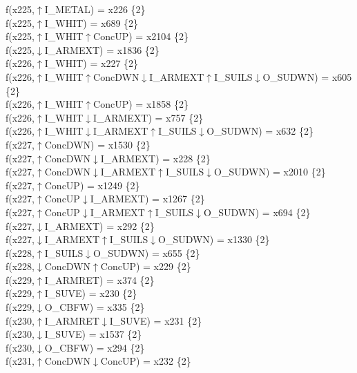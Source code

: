 f(x225,$\uparrow$I\_METAL) = x226 \{2\} \\  
f(x225,$\uparrow$I\_WHIT) = x689 \{2\} \\  
f(x225,$\uparrow$I\_WHIT$\uparrow$ConcUP) = x2104 \{2\} \\  
f(x225,$\downarrow$I\_ARMEXT) = x1836 \{2\} \\  
f(x226,$\uparrow$I\_WHIT) = x227 \{2\} \\  
f(x226,$\uparrow$I\_WHIT$\uparrow$ConcDWN$\downarrow$I\_ARMEXT$\uparrow$I\_SUILS$\downarrow$O\_SUDWN) = x605 \{2\} \\  
f(x226,$\uparrow$I\_WHIT$\uparrow$ConcUP) = x1858 \{2\} \\  
f(x226,$\uparrow$I\_WHIT$\downarrow$I\_ARMEXT) = x757 \{2\} \\  
f(x226,$\uparrow$I\_WHIT$\downarrow$I\_ARMEXT$\uparrow$I\_SUILS$\downarrow$O\_SUDWN) = x632 \{2\} \\  
f(x227,$\uparrow$ConcDWN) = x1530 \{2\} \\  
f(x227,$\uparrow$ConcDWN$\downarrow$I\_ARMEXT) = x228 \{2\} \\  
f(x227,$\uparrow$ConcDWN$\downarrow$I\_ARMEXT$\uparrow$I\_SUILS$\downarrow$O\_SUDWN) = x2010 \{2\} \\  
f(x227,$\uparrow$ConcUP) = x1249 \{2\} \\  
f(x227,$\uparrow$ConcUP$\downarrow$I\_ARMEXT) = x1267 \{2\} \\  
f(x227,$\uparrow$ConcUP$\downarrow$I\_ARMEXT$\uparrow$I\_SUILS$\downarrow$O\_SUDWN) = x694 \{2\} \\  
f(x227,$\downarrow$I\_ARMEXT) = x292 \{2\} \\  
f(x227,$\downarrow$I\_ARMEXT$\uparrow$I\_SUILS$\downarrow$O\_SUDWN) = x1330 \{2\} \\  
f(x228,$\uparrow$I\_SUILS$\downarrow$O\_SUDWN) = x655 \{2\} \\  
f(x228,$\downarrow$ConcDWN$\uparrow$ConcUP) = x229 \{2\} \\  
f(x229,$\uparrow$I\_ARMRET) = x374 \{2\} \\  
f(x229,$\uparrow$I\_SUVE) = x230 \{2\} \\  
f(x229,$\downarrow$O\_CBFW) = x335 \{2\} \\  
f(x230,$\uparrow$I\_ARMRET$\downarrow$I\_SUVE) = x231 \{2\} \\  
f(x230,$\downarrow$I\_SUVE) = x1537 \{2\} \\  
f(x230,$\downarrow$O\_CBFW) = x294 \{2\} \\  
f(x231,$\uparrow$ConcDWN$\downarrow$ConcUP) = x232 \{2\} \\  
